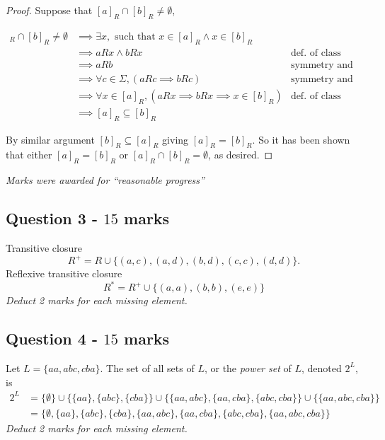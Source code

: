 \documentclass[12pt]{article}
\begin{document}
\begin{proof}
Suppose that $[a]_R \cap [b]_R \neq \emptyset$,

\begin{align*}
[a]_R \cap [b]_R \neq \emptyset &\implies \exists x, \text{ such that }x \in [a]_R \land x \in [b]_R &\\
&\implies aRx \land bRx & \text{def. of class}\\
&\implies aRb & \text{symmetry and transitivity} \\
&\implies \forall c \in \Sigma,  ( aRc \implies bRc) & \text{symmetry and transitivity}\\
&\implies \forall x \in [a]_R, (aRx \implies bRx \implies x \in[b]_R) &\text{def. of class} \\
&\implies [a]_R \subseteq [b]_R
\end{align*}

By similar argument $[b]_R \subseteq [a]_R$ giving $[a]_R = [b]_R$. So it has been shown that either $[a]_R = [b]_R$ or $[a]_R \cap [b]_R = \emptyset$, as desired.
\end{proof}
\emph{Marks were awarded for ``reasonable progress''}

\subsection*{Question 3 - $15$ marks}
Transitive closure $$R^+ = R \cup \{(a,c),(a,d),(b,d),(c,c),(d,d)\}.$$
Reflexive transitive closure $$R^* = R^+ \cup \{(a,a),(b,b),(e,e)\}$$
\emph{Deduct 2 marks for each missing element.}

\subsection*{Question 4 - $15$ marks}
Let $L = \{aa,abc,cba\}$. The set of all sets of $L$, or the \emph{power set} of $L$, denoted $2^L$, is 
\begin{align*}
2^L &= \{\emptyset \} \cup \{ \{aa\}, \{abc\}, \{cba\}  \} \cup \{ \{aa,abc\}, \{aa,cba\}, \{abc,cba\} \} \cup \{ \{aa,abc,cba\} \} \\
&=\{\emptyset, \{aa\}, \{abc\}, \{cba\}, \{aa,abc\}, \{aa,cba\}, \{abc,cba\}, \{aa,abc,cba\} \}
\end{align*}
\emph{Deduct 2 marks for each missing element.}
\end{document}
